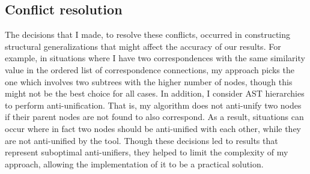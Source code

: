 
\subsection{Conflict resolution}  \label{conflicts}
The decisions that I made, to resolve these conflicts, occurred in constructing structural generalizations that might affect the accuracy of our results.
For example, in situations where I have two correspondences with the same similarity value in the ordered list of correspondence connections, my approach picks the one which involves two subtrees with the higher number of nodes, though this might not be the best choice for all cases.
In addition, I consider AST hierarchies to perform anti-unification. That is, my algorithm does not anti-unify two nodes if their parent nodes are not found to also correspond. As a result, situations can occur where in fact two nodes should be anti-unified with each other, while they are not anti-unified by the tool. Though these decisions led to results that represent suboptimal anti-unifiers, they helped to limit the complexity of my approach, allowing the implementation of it to be a practical solution.








